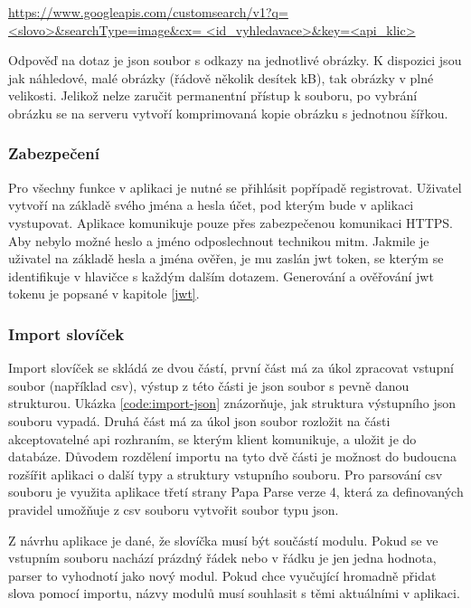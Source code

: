 \documentclass[a4paper,11pt,titlepage,fleqn]{article}
\begin{document}
            \url{https://www.googleapis.com/customsearch/v1?q=<slovo>&searchType=image&cx=
            <id_vyhledavace>&key=<api_klic>}\sloppy

            Odpověď na dotaz je \gls{json} soubor s odkazy na jednotlivé obrázky. K dispozici jsou jak náhledové, malé obrázky (řádově několik desítek kB), tak obrázky v plné velikosti. Jelikož nelze zaručit permanentní přístup k souboru, po vybrání obrázku se na serveru vytvoří komprimovaná kopie obrázku s jednotnou šířkou. 

        \subsubsection{Zabezpečení}
            Pro všechny funkce v aplikaci je nutné se přihlásit popřípadě registrovat. Uživatel vytvoří na základě svého jména a hesla účet, pod kterým bude v aplikaci vystupovat. Aplikace komunikuje pouze přes zabezpečenou komunikaci HTTPS. Aby nebylo možné heslo a jméno odposlechnout technikou \gls{mitm}. Jakmile je uživatel na základě hesla a jména ověřen, je mu zaslán \gls{jwt} token, se kterým se identifikuje v hlavičce s každým dalším dotazem. Generování a ověřování \gls{jwt} tokenu je popsané v kapitole \ref{jwt}.

        \subsubsection{Import slovíček}
            Import slovíček se skládá ze dvou částí, první část má za úkol zpracovat vstupní soubor (například \gls{csv}), výstup z této části je \gls{json} soubor s pevně danou strukturou. Ukázka \ref{code:import-json} znázorňuje, jak struktura výstupního \gls{json} souboru vypadá. Druhá část má za úkol \gls{json} soubor rozložit na části akceptovatelné \gls{api} rozhraním, se kterým klient komunikuje, a uložit je do databáze. Důvodem rozdělení importu na tyto dvě části je možnost do budoucna rozšířit aplikaci o další typy a struktury vstupního souboru. Pro parsování \gls{csv} souboru je využita aplikace třetí strany Papa Parse verze 4, která za definovaných pravidel umožňuje z \gls{csv} souboru vytvořit soubor typu \gls{json}.

            Z návrhu aplikace je dané, že slovíčka musí být součástí modulu. Pokud se ve vstupním souboru nachází prázdný řádek nebo v řádku je jen jedna hodnota, parser to vyhodnotí jako nový modul. Pokud chce vyučující hromadně přidat slova pomocí importu, názvy modulů musí souhlasit s těmi aktuálními v aplikaci.
\end{document}
